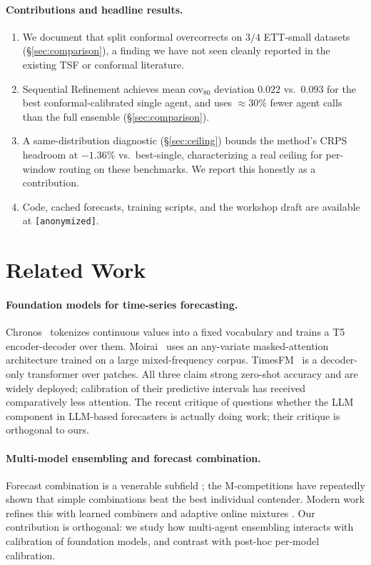 \documentclass{article}
\begin{document}
\paragraph{Contributions and headline results.}
\begin{enumerate}
\item We document that split conformal overcorrects on $3/4$ ETT-small
  datasets (\S\ref{sec:comparison}), a finding we have not seen
  cleanly reported in the existing TSF or conformal literature.
\item Sequential Refinement achieves mean cov$_{80}$ deviation $0.022$
  vs.\ $0.093$ for the best conformal-calibrated single agent, and
  uses $\approx 30\%$ fewer agent calls than the full ensemble
  (\S\ref{sec:comparison}).
\item A same-distribution diagnostic (\S\ref{sec:ceiling}) bounds the
  method's CRPS headroom at $-1.36\%$ vs.\ best-single, characterizing
  a real ceiling for per-window routing on these benchmarks. We
  report this honestly as a contribution.
\item Code, cached forecasts, training scripts, and the workshop draft
  are available at \texttt{[anonymized]}.
\end{enumerate}

\section{Related Work}
\label{sec:related}

\paragraph{Foundation models for time-series forecasting.}
Chronos~\cite{ansari2024chronos} tokenizes continuous values into a fixed
vocabulary and trains a T5 encoder-decoder over them. Moirai~\cite{liu2024moirai}
uses an any-variate masked-attention architecture trained on a large
mixed-frequency corpus. TimesFM~\cite{das2024timesfm} is a decoder-only
transformer over patches. All three claim strong zero-shot accuracy and
are widely deployed; calibration of their predictive intervals has
received comparatively less attention. The recent critique of
\cite{tan2024lms} questions whether the LLM component in LLM-based
forecasters is actually doing work; their critique is orthogonal to ours.

\paragraph{Multi-model ensembling and forecast combination.}
Forecast combination is a venerable subfield
\cite{bates1969combination,clemen1989combining}; the M-competitions
\cite{makridakis2020m4} have repeatedly shown that simple combinations
beat the best individual contender. Modern work refines this with
learned combiners \cite{montero2020fforma} and adaptive online
mixtures \cite{saadallah2021drl}. Our contribution is orthogonal: we
study how multi-agent ensembling interacts with calibration of
foundation models, and contrast with post-hoc per-model calibration.
\end{document}
